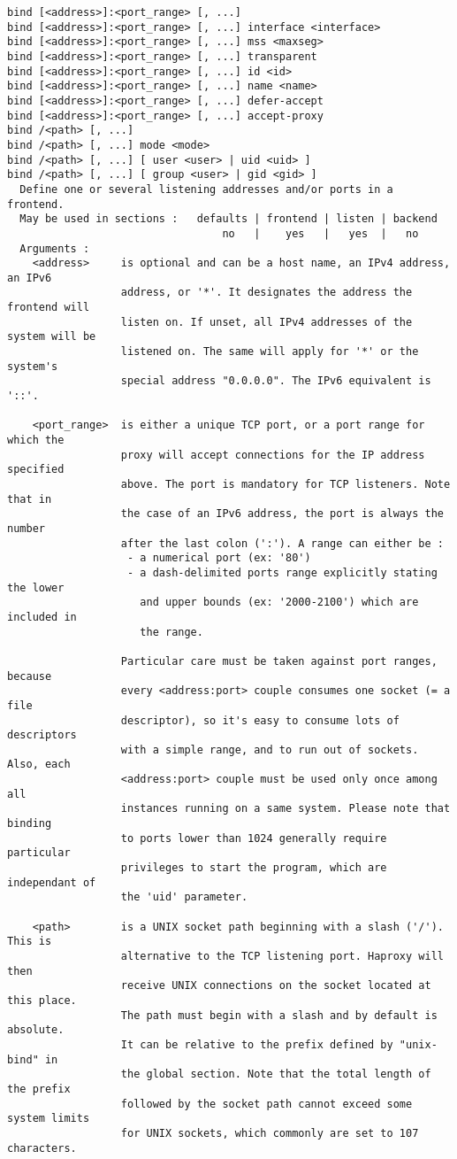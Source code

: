 \begin{verbatim}
bind [<address>]:<port_range> [, ...]
bind [<address>]:<port_range> [, ...] interface <interface>
bind [<address>]:<port_range> [, ...] mss <maxseg>
bind [<address>]:<port_range> [, ...] transparent
bind [<address>]:<port_range> [, ...] id <id>
bind [<address>]:<port_range> [, ...] name <name>
bind [<address>]:<port_range> [, ...] defer-accept
bind [<address>]:<port_range> [, ...] accept-proxy
bind /<path> [, ...]
bind /<path> [, ...] mode <mode>
bind /<path> [, ...] [ user <user> | uid <uid> ]
bind /<path> [, ...] [ group <user> | gid <gid> ]
  Define one or several listening addresses and/or ports in a frontend.
  May be used in sections :   defaults | frontend | listen | backend
                                  no   |    yes   |   yes  |   no
  Arguments :
    <address>     is optional and can be a host name, an IPv4 address, an IPv6
                  address, or '*'. It designates the address the frontend will
                  listen on. If unset, all IPv4 addresses of the system will be
                  listened on. The same will apply for '*' or the system's
                  special address "0.0.0.0". The IPv6 equivalent is '::'.

    <port_range>  is either a unique TCP port, or a port range for which the
                  proxy will accept connections for the IP address specified
                  above. The port is mandatory for TCP listeners. Note that in
                  the case of an IPv6 address, the port is always the number
                  after the last colon (':'). A range can either be :
                   - a numerical port (ex: '80')
                   - a dash-delimited ports range explicitly stating the lower
                     and upper bounds (ex: '2000-2100') which are included in
                     the range.

                  Particular care must be taken against port ranges, because
                  every <address:port> couple consumes one socket (= a file
                  descriptor), so it's easy to consume lots of descriptors
                  with a simple range, and to run out of sockets. Also, each
                  <address:port> couple must be used only once among all
                  instances running on a same system. Please note that binding
                  to ports lower than 1024 generally require particular
                  privileges to start the program, which are independant of
                  the 'uid' parameter.

    <path>        is a UNIX socket path beginning with a slash ('/'). This is
                  alternative to the TCP listening port. Haproxy will then
                  receive UNIX connections on the socket located at this place.
                  The path must begin with a slash and by default is absolute.
                  It can be relative to the prefix defined by "unix-bind" in
                  the global section. Note that the total length of the prefix
                  followed by the socket path cannot exceed some system limits
                  for UNIX sockets, which commonly are set to 107 characters.


\end{verbatim}
